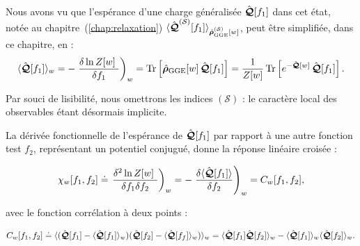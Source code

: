 Nous avons vu que l'espérance d'une charge généralisée \( \hat{\bm{\mathcal{Q}}}[f_1] \) dans cet état, notée au chapitre~(\ref{chap:relaxation}) \( \langle \hat{\bm{\mathcal{Q}}}^{(\mathcal{S})}[f_1] \rangle_{\hat{\bm{\rho}}_{\mathrm{GGE}}^{(\mathcal{S})}[w]} \), peut être simplifiée, dans ce chapitre, en :
\begin{eqnarray*}
	\langle \operator{\mathcal{Q}}[f_1] \rangle_w =  -  \left . \frac{ \delta \ln Z [w] }{ \delta f_1  } \right)_{w}  = \mathrm{Tr} \left[ \operator{\rho}_{\mathrm{GGE}}[w]\, \operator{\mathcal{Q}}[f_1] \right]
= \frac{1}{Z[w]}\, \mathrm{Tr} \left[ e^{-\operator{\mathcal{Q}}[w]}\, \operator{\mathcal{Q}}[f_1] \right] .	
\end{eqnarray*}

Par souci de lisibilité, nous omettrons les indices \((\mathcal{S})\) : le caractère local des observables étant désormais implicite.



\medskip

La dérivée fonctionnelle de l'espérance de \( \hat{\bm{\mathcal{Q}}}[f_1] \) par rapport à une autre fonction test \( f_2 \), représentant un potentiel conjugué, donne la réponse linéaire croisée :

\begin{eqnarray*}
	\chi_w[f_1, f_2] \doteq   \left . \frac{ \delta^2 \ln Z [w] }{ \delta f_1 \delta f_2 } \right)_{w} =  - \left.\frac{\delta \langle \operator{\mathcal{Q}}[f_1] \rangle}{\delta f_2} \right )_w = C_w[f_1, f_2] , 	
\end{eqnarray*}

avec le fonction corrélation à deux points : 

\begin{eqnarray*}
	C_w[f_1, f_2] \doteq  	\langle ( \hat{\bm{\mathcal{Q}}}[f_1] - \langle \hat{\bm{\mathcal{Q}}}[f_1] \rangle_w ) ( \hat{\bm{\mathcal{Q}}}[f_2] - \langle \hat{\bm{\mathcal{Q}}}[f_f] \rangle_w  ) \rangle_w = \langle \hat{\bm{\mathcal{Q}}}[f_1] \hat{\bm{\mathcal{Q}}}[f_2] \rangle_w - \langle \hat{\bm{\mathcal{Q}}}[f_1] \rangle_w \langle \hat{\bm{\mathcal{Q}}}[f_2] \rangle_w.
\end{eqnarray*}


